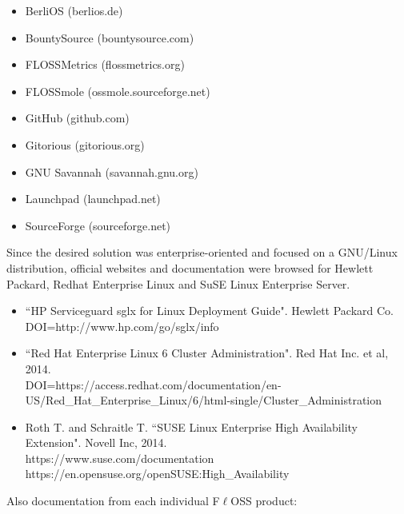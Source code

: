 \documentclass[a4paper, 12pt]{book}
\begin{document}
\begin{itemize}
	\item BerliOS (berlios.de)
	\item BountySource (bountysource.com)
	\item FLOSSMetrics (flossmetrics.org)
	\item FLOSSmole (ossmole.sourceforge.net)
	\item GitHub (github.com)
	\item Gitorious (gitorious.org)
	\item GNU Savannah (savannah.gnu.org)
	\item Launchpad (launchpad.net)
	\item SourceForge (sourceforge.net)\\
	
\end{itemize}

\noindent Since the desired solution was enterprise-oriented and focused on a GNU/Linux distribution, official websites and documentation were browsed for Hewlett Packard, Redhat Enterprise Linux and SuSE Linux Enterprise Server.

\begin{itemize}
	\item ``HP Serviceguard sglx for Linux Deployment Guide". Hewlett Packard Co.\\
	      DOI=http://www.hp.com/go/sglx/info
	\item ``Red Hat Enterprise Linux 6 Cluster Administration". Red Hat Inc. et al, 2014.\\
	      DOI=https://access.redhat.com/documentation/en-US/Red\_Hat\_Enterprise\_Linux/6/html-single/Cluster\_Administration
	\item Roth T. and Schraitle T. ``SUSE Linux Enterprise High Availability Extension". Novell Inc, 2014.\\
	      https://www.suse.com/documentation\\
	      https://en.opensuse.org/openSUSE:High\_Availability
\end{itemize}

\noindent Also documentation from each individual F$\ell$OSS product:
\end{document}
